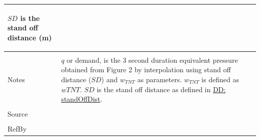 \documentclass[12pt]{article}
\begin{document}
\begin{minipage}{\textwidth}
\begin{tabular}{p{} p{}}
\begin{symbDescription}
              \item{$SD$ is the stand off distance (m)}
              \end{symbDescription}
\\ \midrule \\
Notes & $q$ or demand, is the 3 second duration equivalent pressure obtained from Figure 2 by interpolation using stand off distance ($SD$) and ${w_{TNT}}$ as parameters. ${w_{TNT}}$ is defined as $w TNT$. $SD$ is the stand off distance as defined in \hyperref[DD:standOffDist]{DD: standOffDist}.
\\ \midrule \\
Source & \cite{astm2009}
\\ \midrule \\
RefBy & 
\\ \bottomrule \end{tabular}
\end{minipage}\\
\end{document}
